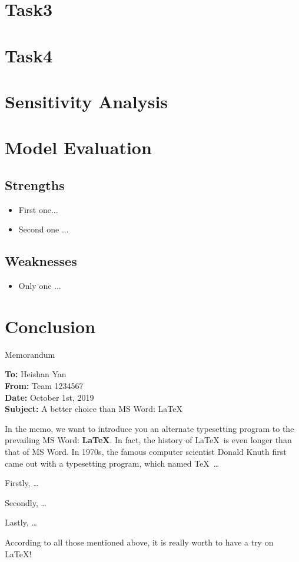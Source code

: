 \documentclass[12pt]{article}  %
\begin{document}
\section{Task3}

\section{Task4}

\section{Sensitivity Analysis}

\section{Model Evaluation}
\subsection{Strengths}
\begin{itemize}
    \item First one...
    \item Second one ...
\end{itemize}

\subsection{Weaknesses}
\begin{itemize}
    \item Only one ...
 \end{itemize}
 
\section{Conclusion}

\begin{letter}{Memorandum}
\begin{flushleft}  %
\textbf{To:} Heishan Yan\\
\textbf{From:} Team 1234567\\
\textbf{Date:} October 1st, 2019\\
\textbf{Subject:} A better choice than MS Word: \LaTeX
\end{flushleft}

In the memo, we want to introduce you an alternate typesetting program to the prevailing MS Word: \textbf{\LaTeX}. In fact, the history of \LaTeX\ is even longer than that of MS Word. In 1970s, the famous computer scientist Donald Knuth first came out with a typesetting program, which named \TeX\ \ldots

Firstly, \ldots

Secondly, \ldots

Lastly, \ldots

According to all those mentioned above, it is really worth to have a try on \LaTeX! 
\end{letter}
\end{document}
